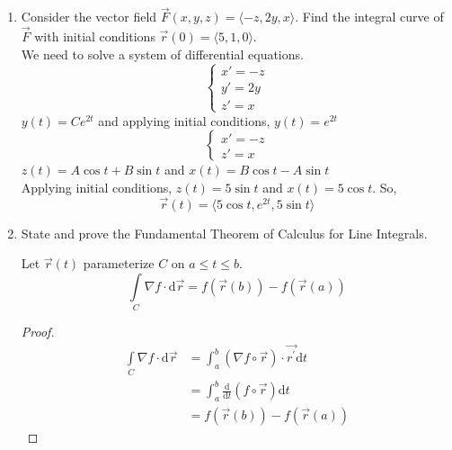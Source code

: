 \begin{enumerate}
	\item Consider the vector field $\vec{F}(x,y,z) = \langle -z, 2y, x \rangle$. Find the integral curve of $\vec{F}$ with initial conditions $\vec{r}(0) = \langle 5, 1, 0\rangle$.\\
	\indent
	We need to solve a system of differential equations.
	\begin{equation*}
		\begin{cases}
			x' = -z \\
			y' = 2y \\
			z' = x
		\end{cases}
	\end{equation*}
	$y(t) = Ce^{2t}$ and applying initial conditions, $y(t) = e^{2t}$
	\begin{equation*}
		\begin{cases}
			x' = -z \\
			z' = x
		\end{cases}
	\end{equation*}
	$z(t) = A\cos{t} + B\sin{t}$ and $x(t) = B\cos{t} - A\sin{t}$\\
	Applying initial conditions, $z(t) = 5\sin{t}$ and $x(t) = 5\cos{t}$. So, 
	\begin{equation*}
		\vec{r}(t) = \langle 5\cos{t}, e^{2t}, 5\sin{t}\rangle
	\end{equation*}
	
	\item State and prove the Fundamental Theorem of Calculus for Line Integrals.\\
	\begin{theorem}
		Let $\vec{r}(t)$ parameterize $C$ on $a \leq t \leq b$.
		\begin{equation*}
			\int\limits_{C}{\nabla f \cdot \mathrm{d}\vec{r}} = f(\vec{r}(b)) - f(\vec{r}(a))
		\end{equation*}
	\end{theorem}
	\begin{proof}
		\begin{align*}
			\int\limits_{C}{\nabla f \cdot \mathrm{d}\vec{r}} &= \int_{a}^{b}{(\nabla f\circ\vec{r}) \cdot \vec{r^\prime}\mathrm{d}t} \\
			&= \int_{a}^{b}{\frac{\mathrm{d}}{\mathrm{d}t}(f\circ\vec{r})\mathrm{d}t} \\
			&= f(\vec{r}(b)) - f(\vec{r}(a))
		\end{align*}
	\end{proof}
\end{enumerate}